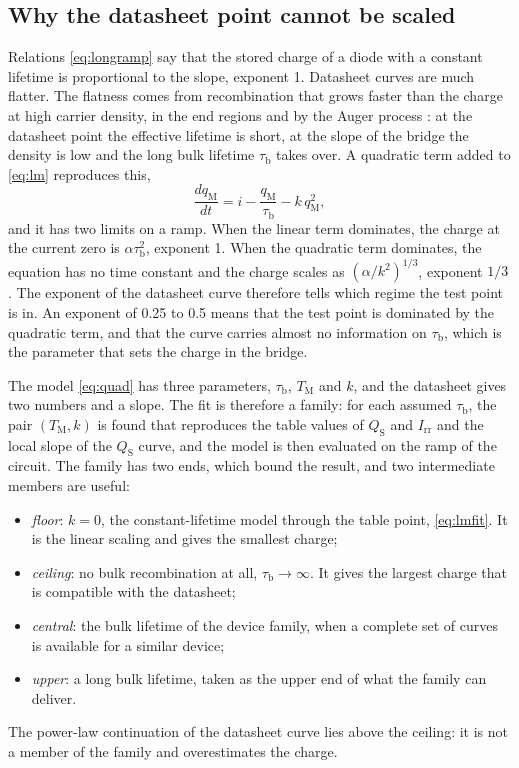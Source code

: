 \documentclass[10pt,a4paper]{scrartcl}
\newcommand{\Irr}{I_\mathrm{rr}}
\newcommand{\taub}{\tau_\mathrm{b}}
\newcommand{\TM}{T_\mathrm{M}}
\begin{document}
\subsection{Why the datasheet point cannot be scaled}
Relations \eqref{eq:longramp} say that the stored charge of a diode with a constant lifetime is proportional to the slope, exponent 1. Datasheet curves are much flatter. The flatness comes from recombination that grows faster than the charge at high carrier density, in the end regions and by the Auger process \cite{schlangenotto1969,schlangenotto1972}: at the datasheet point the effective lifetime is short, at the slope of the bridge the density is low and the long bulk lifetime $\taub$ takes over. A quadratic term added to \eqref{eq:lm} reproduces this,
\begin{equation}
\frac{dq_\mathrm{M}}{dt} = i - \frac{q_\mathrm{M}}{\taub} - k\,q_\mathrm{M}^2 ,
\label{eq:quad}
\end{equation}
and it has two limits on a ramp. When the linear term dominates, the charge at the current zero is $\alpha\taub^2$, exponent 1. When the quadratic term dominates, the equation has no time constant and the charge scales as $(\alpha/k^2)^{1/3}$, exponent $1/3$. The exponent of the datasheet curve therefore tells which regime the test point is in. An exponent of 0.25 to 0.5 means that the test point is dominated by the quadratic term, and that the curve carries almost no information on $\taub$, which is the parameter that sets the charge in the bridge.

The model \eqref{eq:quad} has three parameters, $\taub$, $\TM$ and $k$, and the datasheet gives two numbers and a slope. The fit is therefore a family: for each assumed $\taub$, the pair $(\TM, k)$ is found that reproduces the table values of $Q_\mathrm{S}$ and $\Irr$ and the local slope of the $Q_\mathrm{S}$ curve, and the model is then evaluated on the ramp of the circuit. The family has two ends, which bound the result, and two intermediate members are useful:
\begin{itemize}
\item \emph{floor}: $k = 0$, the constant-lifetime model through the table point, \eqref{eq:lmfit}. It is the linear scaling and gives the smallest charge;
\item \emph{ceiling}: no bulk recombination at all, $\taub \to \infty$. It gives the largest charge that is compatible with the datasheet;
\item \emph{central}: the bulk lifetime of the device family, when a complete set of curves is available for a similar device;
\item \emph{upper}: a long bulk lifetime, taken as the upper end of what the family can deliver.
\end{itemize}
The power-law continuation of the datasheet curve lies above the ceiling: it is not a member of the family and overestimates the charge.
\end{document}
